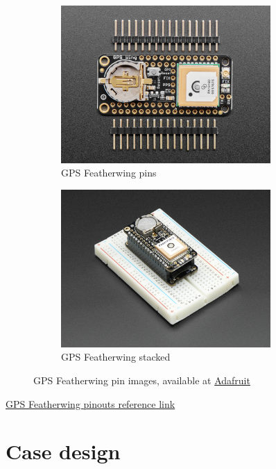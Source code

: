 \begin{appendices}
\begin{figure}[H]        
    \centering
    \begin{subfigure}[b]{0.35\textwidth}
        \centering
        \includegraphics[angle=90,width=\textwidth,height=6cm, keepaspectratio]{../figures/gpspins.jpg}
        \caption{GPS Featherwing pins}
        \label{fig:gpspin}
    \end{subfigure}
    \hfill
    \begin{subfigure}[b]{0.6\textwidth}  
        \centering 
        \includegraphics[height=6cm,width=\textwidth, keepaspectratio]{../figures/gpsstack.jpg}
        \caption{GPS Featherwing stacked}
        \label{fig:gpstack}
    \end{subfigure}  
    \caption[GPS Featherwing pin images]{GPS Featherwing pin images, available at \href{https://www.adafruit.com/product/3133}{Adafruit \faExternalLink}}    
    \label{fig:gpspins}     
\end{figure}

\href{https://learn.adafruit.com/adafruit-ultimate-gps-featherwing/pinouts}{GPS Featherwing pinouts reference link \faExternalLink}

\vfill

\chapter{Case design}
    

\end{appendices}
